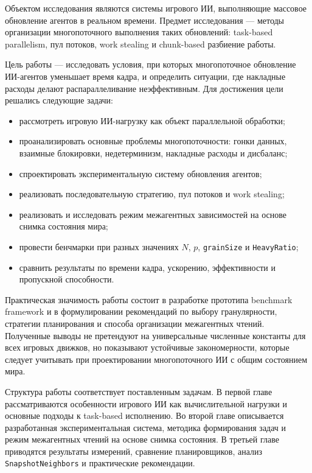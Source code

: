 \documentclass[14pt,a4paper,oneside]{extreport}
\begin{document}
Объектом исследования являются системы игрового ИИ, выполняющие массовое обновление агентов в реальном времени. Предмет исследования --- методы организации многопоточного выполнения таких обновлений: task-based parallelism, пул потоков, work stealing и chunk-based разбиение работы.

Цель работы --- исследовать условия, при которых многопоточное обновление ИИ-агентов уменьшает время кадра, и определить ситуации, где накладные расходы делают распараллеливание неэффективным. Для достижения цели решались следующие задачи:
\begin{itemize}
    \item рассмотреть игровую ИИ-нагрузку как объект параллельной обработки;
    \item проанализировать основные проблемы многопоточности: гонки данных, взаимные блокировки, недетерминизм, накладные расходы и дисбаланс;
    \item спроектировать экспериментальную систему обновления агентов;
    \item реализовать последовательную стратегию, пул потоков и work stealing;
    \item реализовать и исследовать режим межагентных зависимостей на основе снимка состояния мира;
    \item провести бенчмарки при разных значениях \(N\), \(p\), \texttt{grainSize} и \texttt{HeavyRatio};
    \item сравнить результаты по времени кадра, ускорению, эффективности и пропускной способности.
\end{itemize}

Практическая значимость работы состоит в разработке прототипа benchmark framework и в формулировании рекомендаций по выбору гранулярности, стратегии планирования и способа организации межагентных чтений. Полученные выводы не претендуют на универсальные численные константы для всех игровых движков, но показывают устойчивые закономерности, которые следует учитывать при проектировании многопоточного ИИ с общим состоянием мира.

Структура работы соответствует поставленным задачам. В первой главе рассматриваются особенности игрового ИИ как вычислительной нагрузки и основные подходы к task-based исполнению. Во второй главе описывается разработанная экспериментальная система, методика формирования задач и режим межагентных чтений на основе снимка состояния. В третьей главе приводятся результаты измерений, сравнение планировщиков, анализ \texttt{SnapshotNeighbors} и практические рекомендации.
\end{document}
